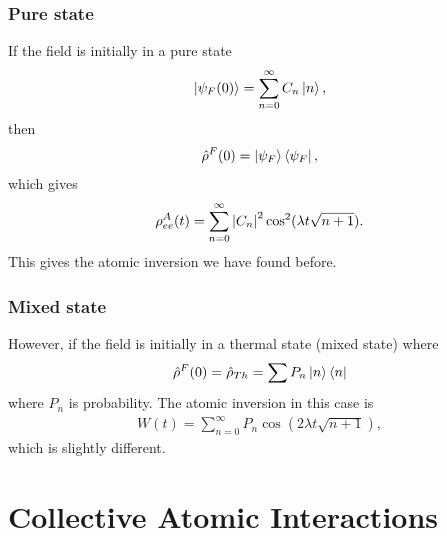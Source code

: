\documentclass{book}
\theoremstyle{definition}
\begin{document}
\subsubsection{Pure state}
If the field is initially in a pure state
\begin{align}
\ket{\psi_F(0)} = \sum^\infty_{n=0}C_n\ket{n},
\end{align}
then
\begin{align}
\hat{\rho}^F(0) = \ket{\psi_F}\bra{\psi_F},
\end{align}
which gives
\begin{align}
\rho^A_{ee}(t) = \sum^\infty_{n=0}\abs{C_n}^2\cos^2(\lambda t \sqrt{n+1}).
\end{align}
This gives the atomic inversion we have found before. 
\subsubsection{Mixed state}
However, if the field is initially in a thermal state (mixed state) where
\begin{align}
\hat{\rho}^F(0) = \hat{\rho}_{Th} = \sum P_n\ket{n}\bra{n}
\end{align}
where $P_n$ is probability. The atomic inversion in this case is
\begin{align}
W(t) = \sum^\infty_{n=0}P_n \cos(2\lambda t\sqrt{n+1}),
\end{align}
which is slightly different. 



















\newpage

\section{Collective Atomic Interactions}



\newpage
\end{document}
